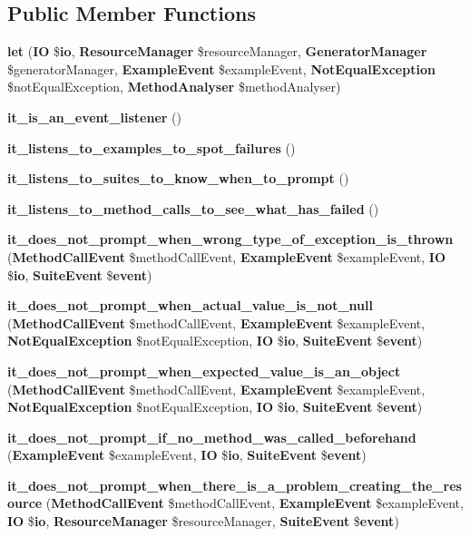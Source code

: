 \subsection*{Public Member Functions}
\begin{DoxyCompactItemize}
\item 
{\bf let} ({\bf I\+O} \${\bf io}, {\bf Resource\+Manager} \$resource\+Manager, {\bf Generator\+Manager} \$generator\+Manager, {\bf Example\+Event} \$example\+Event, {\bf Not\+Equal\+Exception} \$not\+Equal\+Exception, {\bf Method\+Analyser} \$method\+Analyser)
\item 
{\bf it\+\_\+is\+\_\+an\+\_\+event\+\_\+listener} ()
\item 
{\bf it\+\_\+listens\+\_\+to\+\_\+examples\+\_\+to\+\_\+spot\+\_\+failures} ()
\item 
{\bf it\+\_\+listens\+\_\+to\+\_\+suites\+\_\+to\+\_\+know\+\_\+when\+\_\+to\+\_\+prompt} ()
\item 
{\bf it\+\_\+listens\+\_\+to\+\_\+method\+\_\+calls\+\_\+to\+\_\+see\+\_\+what\+\_\+has\+\_\+failed} ()
\item 
{\bf it\+\_\+does\+\_\+not\+\_\+prompt\+\_\+when\+\_\+wrong\+\_\+type\+\_\+of\+\_\+exception\+\_\+is\+\_\+thrown} ({\bf Method\+Call\+Event} \$method\+Call\+Event, {\bf Example\+Event} \$example\+Event, {\bf I\+O} \${\bf io}, {\bf Suite\+Event} \${\bf event})
\item 
{\bf it\+\_\+does\+\_\+not\+\_\+prompt\+\_\+when\+\_\+actual\+\_\+value\+\_\+is\+\_\+not\+\_\+null} ({\bf Method\+Call\+Event} \$method\+Call\+Event, {\bf Example\+Event} \$example\+Event, {\bf Not\+Equal\+Exception} \$not\+Equal\+Exception, {\bf I\+O} \${\bf io}, {\bf Suite\+Event} \${\bf event})
\item 
{\bf it\+\_\+does\+\_\+not\+\_\+prompt\+\_\+when\+\_\+expected\+\_\+value\+\_\+is\+\_\+an\+\_\+object} ({\bf Method\+Call\+Event} \$method\+Call\+Event, {\bf Example\+Event} \$example\+Event, {\bf Not\+Equal\+Exception} \$not\+Equal\+Exception, {\bf I\+O} \${\bf io}, {\bf Suite\+Event} \${\bf event})
\item 
{\bf it\+\_\+does\+\_\+not\+\_\+prompt\+\_\+if\+\_\+no\+\_\+method\+\_\+was\+\_\+called\+\_\+beforehand} ({\bf Example\+Event} \$example\+Event, {\bf I\+O} \${\bf io}, {\bf Suite\+Event} \${\bf event})
\item 
{\bf it\+\_\+does\+\_\+not\+\_\+prompt\+\_\+when\+\_\+there\+\_\+is\+\_\+a\+\_\+problem\+\_\+creating\+\_\+the\+\_\+resource} ({\bf Method\+Call\+Event} \$method\+Call\+Event, {\bf Example\+Event} \$example\+Event, {\bf I\+O} \${\bf io}, {\bf Resource\+Manager} \$resource\+Manager, {\bf Suite\+Event} \${\bf event})

\end{DoxyCompactItemize}
